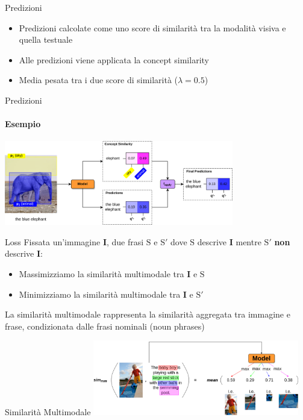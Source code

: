 \documentclass{beamer}
\begin{document}
\begin{frame}{Predizioni}
  \begin{itemize}
    \item Predizioni calcolate come uno \alert{score di similarità}
    tra la modalità visiva e quella testuale
    \item Alle predizioni viene \alert{applicata} la concept
    similarity
    \item \alert{Media pesata} tra i due score di similarità ($\lambda
    = 0.5$)
  \end{itemize}
\end{frame}

\begin{frame}{Predizioni}
  \framesubtitle{Esempio}
  \centering
  \includegraphics[width=10cm]{images/predictions.png}
\end{frame}

\begin{frame}{Loss}
  Fissata un'immagine $\bm{I}$, due frasi $\text{S}$ e $\text{S}'$
  dove $\text{S}$ descrive $\bm{I}$ mentre $\text{S}'$ \textbf{non}
  descrive $\bm{I}$:
  \begin{itemize}
    \item \alert{Massimizziamo} la similarità multimodale tra $\bm{I}$
    e $\text{S}$
    \item \alert{Minimizziamo} la similarità multimodale tra $\bm{I}$
    e $\text{S}'$
  \end{itemize}
  \vspace{1cm}
  La \alert{similarità multimodale} rappresenta la similarità
  aggregata tra immagine e frase, condizionata dalle frasi nominali
  (noun phrases)
\end{frame}

\begin{frame}{Similarità Multimodale}
  \centering
  \includegraphics[width=9cm]{images/sim-mm.png}
\end{frame}
\end{document}
